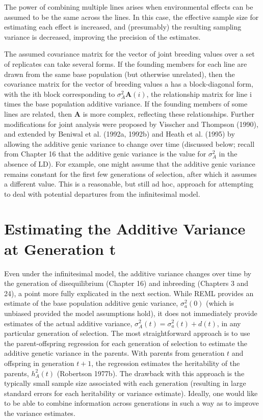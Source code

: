 \documentclass{article}
\begin{document}
The power of combining multiple lines arises when environmental effects can be assumed to be the same across the lines. In this case, the effective sample size for estimating each effect is increased, and (presumably) the resulting sampling variance is decreased, improving the precision of the estimates.

The assumed covariance matrix for the vector of joint breeding values over a set of replicates can take several forms. If the founding members for each line are drawn from the same base population (but otherwise unrelated), then the covariance matrix for the vector of breeding values a has a block-diagonal form, with the ith block corresponding to  $ \sigma_A^2 \mathbf{A}(i) $, the relationship matrix for line i times the base population additive variance. If the founding members of some lines are related, then  $ \mathbf{A} $ is more complex, reflecting these relationships. Further modifications for joint analysis were proposed by Visscher and Thompson (1990), and extended by Beniwal et al. (1992a, 1992b) and Heath et al. (1995) by allowing the additive genic variance to change over time (discussed below; recall from Chapter 16 that the additive genic variance is the value for  $ \sigma_A^2 $ in the absence of LD). For example, one might assume that the additive genic variance remains constant for the first few generations of selection, after which it assumes a different value. This is a reasonable, but still ad hoc, approach for attempting to deal with potential departures from the infinitesimal model.

\section{Estimating the Additive Variance at Generation t}
Even under the infinitesimal model, the additive variance changes over time by the generation of disequilibrium (Chapter 16) and inbreeding (Chapters 3 and 24), a point more fully explicated in the next section. While REML provides an estimate of the base population additive genic variance,  $ \sigma_a^2(0) $ (which is unbiased provided the model assumptions hold), it does not immediately provide estimates of the actual additive variance,  $ \sigma_A^2(t) = \sigma_a^2(t) + d(t) $, in any particular generation of selection. The most straightforward approach is to use the parent-offspring regression for each generation of selection to estimate the additive genetic variance in the parents. With parents from generation  $ t $ and offspring in generation  $ t + 1 $, the regression estimates the heritability of the parents,  $ h_A^2(t) $ (Robertson 1977b). The drawback with this approach is the typically small sample size associated with each generation (resulting in large standard errors for each heritability or variance estimate). Ideally, one would like to be able to combine information across generations in such a way as to improve the variance estimates.
\end{document}
